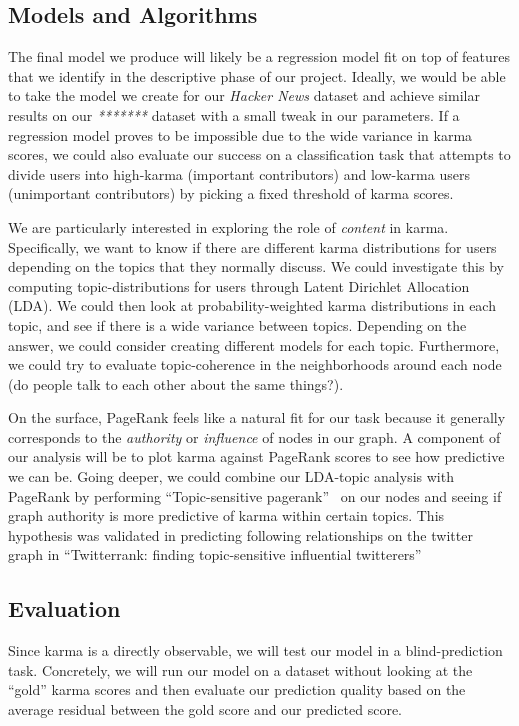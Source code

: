 \documentclass[11pt]{article}
\newcommand{\titlecite}[2]{``#1''~\cite{#2}}
\begin{document}
\subsection{Models and Algorithms}
The final model we produce will likely be a regression model fit on top of
features that we identify in the descriptive phase of our project. Ideally, we
would be able to take the model we create for our \textit{Hacker News} dataset
and achieve similar results on our \textit{*******} dataset with a small tweak
in our parameters. If a regression model proves to be impossible due to the wide
variance in karma scores, we could also evaluate our success on a classification
task that attempts to divide users into high-karma (important contributors) and
low-karma users (unimportant contributors) by picking a fixed threshold of karma
scores.

We are particularly interested in exploring the role of \textit{content} in
karma. Specifically, we want to know if there are different karma distributions
for users depending on the topics that they normally discuss. We could 
investigate this by computing topic-distributions for users through Latent
Dirichlet Allocation (LDA). We could then look at probability-weighted karma
distributions in each topic, and see if there is a wide variance between topics.
Depending on the answer, we could consider creating different models for each
topic. Furthermore, we could try to evaluate topic-coherence in the
neighborhoods around each node (do people talk to each other about the same
things?).

On the surface, PageRank feels like a natural fit for our task because it
generally corresponds to the \textit{authority} or \textit{influence} of nodes
in our graph. A component of our analysis will be to plot karma against PageRank
scores to see how predictive we can be.  Going deeper, we could combine our
LDA-topic analysis with PageRank by performing \titlecite{Topic-sensitive
pagerank}{haveliwala2002topic} on our nodes and seeing if graph authority is
more predictive of karma within certain topics. This hypothesis was validated in
predicting following relationships on the twitter graph in
\titlecite{Twitterrank: finding topic-sensitive influential
twitterers}{weng2010twitterrank}

\subsection{Evaluation}
Since karma is a directly observable, we will test our model in a
blind-prediction task. Concretely, we will run our model on a dataset without
looking at the ``gold'' karma scores and then evaluate our prediction quality
based on the average residual between the gold score and our predicted score.
\end{document}

